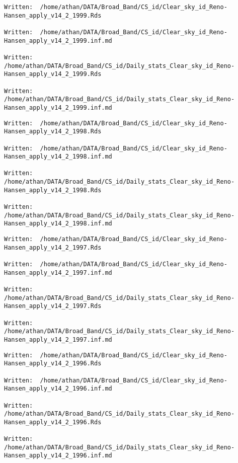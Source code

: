 \documentclass[
  10pt,
  a4paper,oneside]{article}
\begin{document}
\begin{verbatim}
Written:  /home/athan/DATA/Broad_Band/CS_id/Clear_sky_id_Reno-Hansen_apply_v14_2_1999.Rds 

Written:  /home/athan/DATA/Broad_Band/CS_id/Clear_sky_id_Reno-Hansen_apply_v14_2_1999.inf.md 

Written:  /home/athan/DATA/Broad_Band/CS_id/Daily_stats_Clear_sky_id_Reno-Hansen_apply_v14_2_1999.Rds 

Written:  /home/athan/DATA/Broad_Band/CS_id/Daily_stats_Clear_sky_id_Reno-Hansen_apply_v14_2_1999.inf.md 
\end{verbatim}

\begin{verbatim}
Written:  /home/athan/DATA/Broad_Band/CS_id/Clear_sky_id_Reno-Hansen_apply_v14_2_1998.Rds 

Written:  /home/athan/DATA/Broad_Band/CS_id/Clear_sky_id_Reno-Hansen_apply_v14_2_1998.inf.md 

Written:  /home/athan/DATA/Broad_Band/CS_id/Daily_stats_Clear_sky_id_Reno-Hansen_apply_v14_2_1998.Rds 

Written:  /home/athan/DATA/Broad_Band/CS_id/Daily_stats_Clear_sky_id_Reno-Hansen_apply_v14_2_1998.inf.md 
\end{verbatim}

\begin{verbatim}
Written:  /home/athan/DATA/Broad_Band/CS_id/Clear_sky_id_Reno-Hansen_apply_v14_2_1997.Rds 

Written:  /home/athan/DATA/Broad_Band/CS_id/Clear_sky_id_Reno-Hansen_apply_v14_2_1997.inf.md 

Written:  /home/athan/DATA/Broad_Band/CS_id/Daily_stats_Clear_sky_id_Reno-Hansen_apply_v14_2_1997.Rds 

Written:  /home/athan/DATA/Broad_Band/CS_id/Daily_stats_Clear_sky_id_Reno-Hansen_apply_v14_2_1997.inf.md 
\end{verbatim}

\begin{verbatim}
Written:  /home/athan/DATA/Broad_Band/CS_id/Clear_sky_id_Reno-Hansen_apply_v14_2_1996.Rds 

Written:  /home/athan/DATA/Broad_Band/CS_id/Clear_sky_id_Reno-Hansen_apply_v14_2_1996.inf.md 

Written:  /home/athan/DATA/Broad_Band/CS_id/Daily_stats_Clear_sky_id_Reno-Hansen_apply_v14_2_1996.Rds 

Written:  /home/athan/DATA/Broad_Band/CS_id/Daily_stats_Clear_sky_id_Reno-Hansen_apply_v14_2_1996.inf.md 
\end{verbatim}
\end{document}
